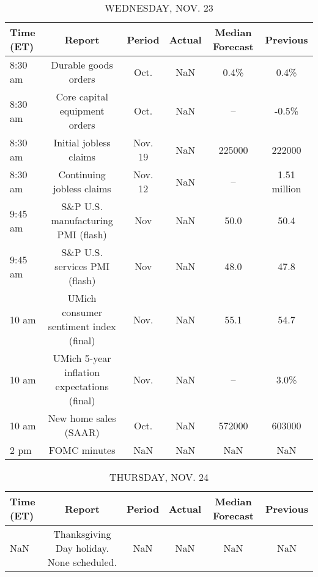 \documentclass{article}%
\begin{document}
\begin{table}[htbp]%
\caption{WEDNESDAY, NOV. 23}%
\centering%
\begin{adjustbox}{width=1\textwidth}%
\begin{tabular}{lccccc}
\toprule
Time (ET) &                                      Report &  Period & Actual & Median Forecast &     Previous \\
\midrule
  8:30 am &                        Durable goods orders &    Oct. &    NaN &            0.4\% &         0.4\% \\
  8:30 am &               Core capital equipment orders &    Oct. &    NaN &              -- &        -0.5\% \\
  8:30 am &                      Initial jobless claims & Nov. 19 &    NaN &          225000 &       222000 \\
  8:30 am &                   Continuing jobless claims & Nov. 12 &    NaN &              -- & 1.51 million \\
  9:45 am &          S\&P U.S. manufacturing PMI (flash) &     Nov &    NaN &            50.0 &         50.4 \\
  9:45 am &               S\&P U.S. services PMI (flash) &     Nov &    NaN &            48.0 &         47.8 \\
    10 am &      UMich consumer sentiment index (final) &    Nov. &    NaN &            55.1 &         54.7 \\
    10 am & UMich 5-year inflation expectations (final) &    Nov. &    NaN &              -- &         3.0\% \\
    10 am &                       New home sales (SAAR) &    Oct. &    NaN &          572000 &       603000 \\
     2 pm &                                FOMC minutes &     NaN &    NaN &             NaN &          NaN \\
\bottomrule
\end{tabular}
%
\end{adjustbox}%
\end{table}

%


\begin{table}[htbp]%
\caption{THURSDAY, NOV. 24}%
\centering%
\begin{adjustbox}{width=1\textwidth}%
\begin{tabular}{lccccc}
\toprule
Time (ET) &                                    Report & Period & Actual & Median Forecast & Previous \\
\midrule
      NaN & Thanksgiving Day holiday. None scheduled. &    NaN &    NaN &             NaN &      NaN \\
\bottomrule
\end{tabular}
%
\end{adjustbox}%
\end{table}
\end{document}
